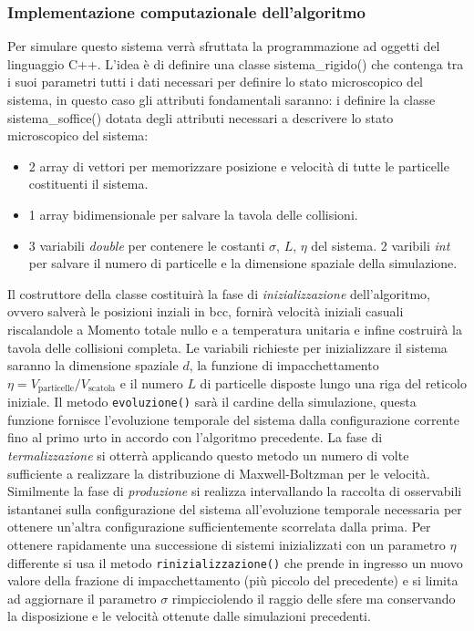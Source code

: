 \documentclass[11pt]{article}
\theoremstyle{plain}
\theoremstyle{remark}
\newcommand\Cls[1]{\textsf{#1}}
\newcommand{\cd}[1]{\texttt{#1}}
\begin{document}
\subsubsection{Implementazione computazionale dell'algoritmo}
Per simulare questo sistema verrà sfruttata la programmazione ad oggetti del linguaggio C++.
L'idea è di definire una classe \Cls{sistema\_rigido()} che contenga tra i suoi parametri tutti i dati necessari per definire lo stato microscopico del sistema, in questo caso gli attributi fondamentali saranno:
i definire la classe \Cls{sistema\_soffice()} dotata degli attributi necessari a descrivere lo stato microscopico del sistema:
\begin{itemize}
\item 2 array di vettori per memorizzare posizione e velocità di tutte le particelle costituenti il sistema.

\item 1 array bidimensionale per salvare la tavola delle collisioni.

\item 3 variabili \emph{double} per contenere le costanti $\sigma$, $L$, $\eta$ del sistema. 2 varibili \emph{int} per salvare il numero di particelle e la dimensione spaziale della simulazione.

\end{itemize}
Il costruttore della classe costituirà la fase di \emph{inizializzazione} dell'algoritmo, ovvero salverà le posizioni inziali in bcc, fornirà velocità iniziali casuali riscalandole a Momento totale nullo e a temperatura unitaria e infine costruirà la tavola delle collisioni completa.
Le variabili richieste per inizializzare il sistema saranno la dimensione spaziale $d$, la funzione di impacchettamento $\eta = V_\textrm{particelle} / V_\textrm{scatola}$ e il numero $L$ di particelle disposte lungo una riga del reticolo iniziale.
\medskip\newline
Il metodo \cd{evoluzione()} sarà il cardine della simulazione, questa funzione fornisce l'evoluzione temporale del sistema dalla configurazione corrente fino al primo urto in accordo con l'algoritmo precedente.
\medskip\newline
La fase di \emph{termalizzazione} si otterrà applicando questo metodo un numero di volte sufficiente a realizzare la distribuzione di Maxwell-Boltzman per le velocità.
\medskip\newline
Similmente la fase di \emph{produzione} si realizza intervallando la raccolta di osservabili istantanei sulla configurazione del sistema all'evoluzione temporale necessaria per ottenere un'altra configurazione sufficientemente scorrelata dalla prima.
\medskip\newline
Per ottenere rapidamente una successione di sistemi inizializzati con un parametro $\eta$ differente si usa il metodo \cd{rinizializzazione()} che prende in ingresso un nuovo valore della frazione di impacchettamento (più piccolo del precedente) e si limita ad aggiornare il parametro $\sigma$ rimpicciolendo il raggio delle sfere ma conservando la disposizione e le velocità ottenute dalle simulazioni precedenti.
\end{document}
